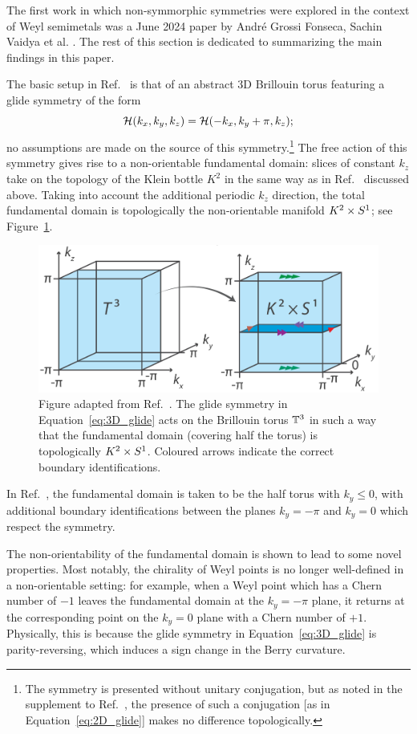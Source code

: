 The first work in which non-symmorphic symmetries were explored in the context of Weyl semimetals was a June 2024 paper by André Grossi Fonseca, Sachin Vaidya et al. \cite{Fonseca-Vaidya_nonorientable}. The rest of this section is dedicated to summarizing the main findings in this paper.

The basic setup in Ref.~\cite{Fonseca-Vaidya_nonorientable} is that of an abstract 3D Brillouin torus featuring a glide symmetry of the form
\begin{equation}\label{eq:3D_glide}
	\mathcal{H}(k_x, k_y, k_z) = \mathcal{H}(-k_x, k_y + \pi, k_z);
\end{equation}
no assumptions are made on the source of this symmetry.\footnote{
	The symmetry is presented without unitary conjugation, but as noted in the supplement to Ref.~\cite{Fonseca-Vaidya_nonorientable}, the presence of such a conjugation [as in Equation~\eqref{eq:2D_glide}] makes no difference topologically.}
The free action of this symmetry gives rise to a non-orientable fundamental domain: slices of constant $k_z$ take on the topology of the Klein bottle $K^2$ in the same way as in Ref.~\cite{CYZ_Klein-gauge} discussed above. Taking into account the additional periodic $k_z$ direction, the total fundamental domain is topologically the non-orientable manifold $K^2\times S^1$; see Figure~\ref{fig:K2S1}.
\begin{figure}[htb!]
	\centering
	\includegraphics[width=.7\linewidth]{Images/K2S1}
	\caption{Figure adapted from Ref.~\cite{Fonseca-Vaidya_nonorientable}. The glide symmetry in Equation~\eqref{eq:3D_glide} acts on the Brillouin torus $\mathbb{T}^3$ in such a way that the fundamental domain (covering half the torus) is topologically $K^2\times S^1$. Coloured arrows indicate the correct boundary identifications.} %
	\label{fig:K2S1}
\end{figure}
In Ref.~\cite{Fonseca-Vaidya_nonorientable}, the fundamental domain is taken to be the half torus with $k_y\leq 0$, with additional boundary identifications between the planes $k_y=-\pi$ and $k_y=0$ which respect the symmetry.

The non-orientability of the fundamental domain is shown to lead to some novel properties. Most notably, the chirality of Weyl points is no longer well-defined in a non-orientable setting: for example, when a Weyl point which has a Chern number of $-1$ leaves the fundamental domain at the $k_y=-\pi$ plane, it returns at the corresponding point on the $k_y=0$ plane with a Chern number of $+1$. Physically, this is because the glide symmetry in Equation~\eqref{eq:3D_glide} is parity-reversing, which induces a sign change in the Berry curvature.


